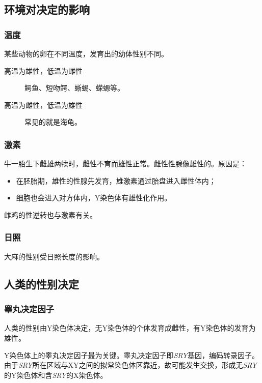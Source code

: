 \subsection{环境对决定的影响}

\subsubsection{温度}

某些动物的卵在不同温度，发育出的幼体性别不同。

\begin{description}
	\item[高温为雄性，低温为雌性] 鳄鱼、短吻鳄、蜥蜴、蝾螈等。
	\item[高温为雌性，低温为雄性] 常见的就是海龟。
\end{description}

\subsubsection{激素}

牛一胎生下雌雄两犊时，雌性不育而雄性正常。雌性性腺像雄性的。原因是：
\begin{itemize}
	\item 在胚胎期，雄性的性腺先发育，雄激素通过胎盘进入雌性体内；
	\item 细胞也会进入对方体内，Y染色体有雄性化作用。
\end{itemize}

雌鸡的性逆转也与激素有关。

\subsubsection{日照}

大麻的性别受日照长度的影响。

\subsection{人类的性别决定}

\subsubsection{睾丸决定因子}

人类的性别由Y染色体决定，无Y染色体的个体发育成雌性，有Y染色体的发育为雄性。

Y染色体上的睾丸决定因子最为关键。睾丸决定因子即\textit{SRY}基因，编码转录因子。由于\textit{SRY}所在区域与XY之间的拟常染色体区靠近，故可能发生交换，形成无\textit{SRY}的Y染色体和含\textit{SRY}的X染色体。

